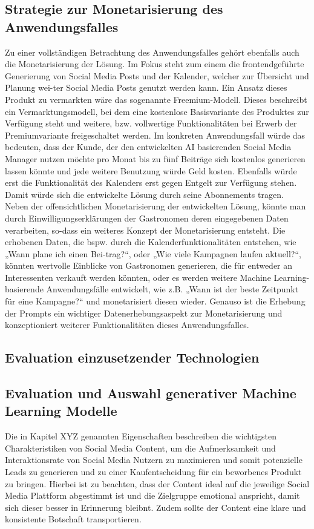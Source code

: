 \subsection{Strategie zur Monetarisierung des Anwendungsfalles}
Zu einer vollständigen Betrachtung des Anwendungsfalles gehört ebenfalls auch die Monetarisierung der Lösung.
Im Fokus steht zum einem die frontendgeführte Generierung von Social Media Posts und der Kalender, welcher zur Übersicht und Planung wei-ter Social Media Posts genutzt werden kann.
Ein Ansatz dieses Produkt zu vermarkten wäre das sogenannte Freemium-Modell.
Dieses beschreibt ein Vermarktungsmodell, bei dem eine kostenlose Basisvariante des Produktes zur Verfügung steht und weitere, bzw. vollwertige Funktionalitäten bei Erwerb der Premiumvariante freigeschaltet werden.
Im konkreten Anwendungsfall würde das bedeuten, dass der Kunde, der den entwickelten AI basierenden Social Media Manager nutzen möchte pro Monat bis zu fünf Beiträge sich kostenlos generieren lassen könnte und jede weitere Benutzung würde Geld kosten.
Ebenfalls würde erst die Funktionalität des Kalenders erst gegen Entgelt zur Verfügung stehen.
Damit würde sich die entwickelte Lösung durch seine Abonnements tragen.
Neben der offensichtlichen Monetarisierung der entwickelten Lösung, könnte man durch Einwilligungserklärungen der Gastronomen deren eingegebenen Daten verarbeiten, so-dass ein weiteres Konzept der Monetarisierung entsteht.
Die erhobenen Daten, die bspw. durch die Kalenderfunktionalitäten entstehen, wie „Wann plane ich einen Bei-trag?“, oder „Wie viele Kampagnen laufen aktuell?“, könnten wertvolle Einblicke von Gastronomen generieren, die für entweder an Interessenten verkauft werden könnten, oder es werden weitere Machine Learning-basierende Anwendungsfälle entwickelt, wie z.B. „Wann ist der beste Zeitpunkt für eine Kampagne?“ und monetarisiert diesen wieder.
Genauso ist die Erhebung der Prompts ein wichtiger Datenerhebungsaspekt zur Monetarisierung und konzeptioniert weiterer Funktionalitäten dieses Anwendungsfalles.

\subsection{Evaluation einzusetzender Technologien}

\subsection{Evaluation und Auswahl generativer Machine Learning Modelle}
Die in Kapitel XYZ genannten Eigenschaften beschreiben die wichtigsten Charakteristiken von Social Media Content, um die Aufmerksamkeit und Interaktionsrate von Social Media Nutzern zu maximieren und somit potenzielle Leads zu generieren und zu einer Kaufentscheidung für ein beworbenes Produkt zu bringen.
Hierbei ist zu beachten, dass der Content ideal auf die jeweilige Social Media Plattform abgestimmt ist und die Zielgruppe emotional anspricht, damit sich dieser besser in Erinnerung bleibnt.
Zudem sollte der Content eine klare und konsistente Botschaft transportieren.


